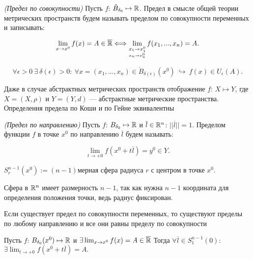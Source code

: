 \begin{definition}
    \textit{(Предел по совокупности)} Пусть $f$: $\mathring{B}_{\delta _0} \mapsto \mathbb{R}$. Предел в смысле общей теории метрических пространств будем называть пределом по совокупности переменных и записывать:

    $$\lim_{x \to x^0} f(x) = A \in \overline{\mathbb{R}}  \Longleftrightarrow \lim\limits_{\underset{x_n \to x_n^0}{x_1 \to x_{1}^0}} f (x_1, ..., x_n) = A. $$
    
    $$\forall \epsilon > 0 \  \exists \  \delta(\epsilon) > 0: \ \forall x = (x_{1}, ..., x_n) \in \mathring{B}_{\delta(\epsilon)}(x^0) \  \hookrightarrow \ f(x) \in U_\epsilon(A).
    $$
    
\end{definition}

\begin{note}
    Даже в случае абстрактных метрических пространств отображение $f$: $X \mapsto Y$, где $X = (X, \rho)$ и $Y = (Y, d)$ --- абстрактные метрические пространства. Определения предела по Коши и по Гейне эквивалентны
\end{note}

\begin{definition}
    \textit{(Предел по направлению)} Пусть $f$: $B_{\delta _0} \mapsto \mathbb{R}$ и $\overline{l} \in \mathbb{R}^n$: $||\overline{l}|| = 1$. Пределом функции $f$ в точке $x^0$ по направлению $\overline{l}$ будем называть:

    $$\lim_{t \to +0} f (x^0 + t\overline{l}) = y^{0} \in Y. $$
\end{definition}

\begin{definition}
$S_r^{n-1}(x^0) := (n-1)$мерная сфера радиуса $r$ с центром в точке $x^0$.

    Сфера в $\mathbb{R}^n$ имеет размерность $n-1$, так как нужна $n-1$ координата для определения положения точки, ведь радиус фиксирован.


\end{definition}

\begin{lemma}
    Если существует предел по совокупности переменных, то существуют пределы по любому направлению и все они равны пределу по совокупности

    Пусть $f$: $B_{\delta _0}(x^0) \mapsto \mathbb{R}$ и $\exists \lim_{x \to x^0} f(x) = A \in \overline{\mathbb{R}}$ Тогда $\forall \overline{l} \in S^{n-1}_1(0)$: $ \exists \lim_{t \to +0} f(x^0 + t\overline{l}) = A.$ 
    
\end{lemma}

